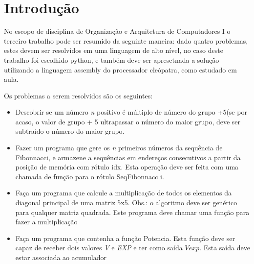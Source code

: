 \section{Introdução}
\label{sec:intro}

No escopo de disciplina de Organização e Arquitetura de Computadores I o
terceiro trabalho pode ser resumido da seguinte maneira: dado quatro problemas,
estes devem ser resolvidos em uma linguagem de alto nível, no caso deste
trabalho foi escolhido python, e também deve ser apresetnada a solução
utilizando a linguagem assembly do processador cleópatra, como estudado em aula.

Os problemas a serem resolvidos são os seguintes:

\begin{itemize}

    \item Descobrir se um número \emph{n} positivo é múltiplo de número do grupo
        +5(se por acaso, o valor de grupo + 5 ultrapassar o número do maior
        grupo, deve ser subtraído o número do maior grupo.

    \item Fazer um programa que gere os \emph{n} primeiros números da sequência
        de Fibonnacci, e armazene a sequências em endereços consecutivos a
        partir da posição de memória com rótulo idx. Esta operação deve ser
        feita com uma chamada de função para o rótulo SeqFibonnacc i.  

    \item Faça um programa que calcule a multiplicação de todos os elementos da
        diagonal principal de uma matriz 5x5. Obs.: o algoritmo deve ser
        genérico para qualquer matriz quadrada. Este programa deve chamar
        uma função para fazer a multiplicação


    \item Faça um programa que contenha a função Potencia. Esta função deve
        ser capaz de receber dois valores \emph{V} e \emph{EXP} e ter como
        saída $V{exp}$. Esta saída deve estar associada ao acumulador


\end{itemize}
